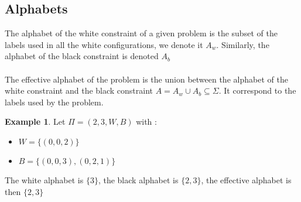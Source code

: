 \documentclass{article}
\theoremstyle{definition}
\newtheorem{exmp}{Example}[section]
\begin{document}
\subsection{Alphabets}
The alphabet of the white constraint of a given problem is the subset of the labels used in all the white configurations, we denote it $A_w$. Similarly, the alphabet of the black constraint is denoted $A_b$\\\\
The effective alphabet of the problem is the union between the alphabet of the white constraint and the black constraint $A = A_w \cup A_b \subseteq \Sigma$. It correspond to the labels used by the problem.
\newpage
\begin{exmp}
Let $\Pi = (2,3,W,B)$ with :
\begin{itemize}
    \item $W = \{(0,0,2)\}$
    \item $B = \{(0,0,3),(0,2,1)\}$
\end{itemize}
The white alphabet is $\{3\}$, the black alphabet is $\{2,3\}$, the effective alphabet is then $\{2,3\}$
\end{exmp}
\end{document}
